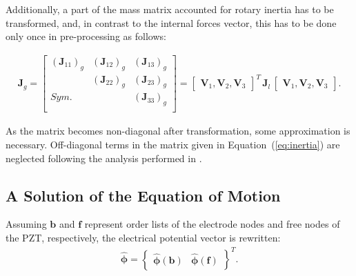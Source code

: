 \documentclass[sensors,article,accept,moreauthors,pdftex]{Definitions/mdpi}
\begin{document}
\begin{paracol}{2}
Additionally, a part of the mass matrix accounted for rotary inertia has to be transformed, and, in contrast to the internal forces vector, this has to be done only once in pre-processing as follows:

\begin{eqnarray}
\textbf{J}_g=\left [ 
\begin{array}{ccc}
	\left (\textbf{J}_{11}\right )_g & \left (\textbf{J}_{12}\right )_g & \left (\textbf{J}_{13}\right )_g\\
	 & \left (\textbf{J}_{22}\right )_g & \left (\textbf{J}_{23}\right )_g\\
	Sym. &  & \left (\textbf{J}_{33}\right )_g\\
\end{array}
\right ]
=\left[\begin{array}{ccc}
	\textbf{V}_1, \textbf{V}_2, \textbf{V}_3 \end{array}\right ]^T
\,\textbf{J}_l\,
\left[\begin{array}{ccc}
	\textbf{V}_1, \textbf{V}_2, \textbf{V}_3 \end{array}\right ].
\label{eq:inertia}
\end{eqnarray}

As the matrix becomes non-diagonal after transformation, some approximation is necessary.
Off-diagonal terms in the matrix given in Equation~(\ref{eq:inertia}) are neglected following the analysis performed in \cite{surana1980transition}.
\subsection{A Solution of the Equation of Motion}
\label{sec:time_integration}
Assuming \(\textbf{b}\) and \(\textbf{f}\) represent order lists of the electrode nodes and free nodes of the PZT, respectively, the electrical potential vector is rewritten:
\begin{eqnarray}
\widehat{\boldsymbol{\phi}} = \left \{\begin{array}{cc}
\widehat{\boldsymbol{\phi}}(\textbf{b}) &
\widehat{\boldsymbol{\phi}}(\textbf{f})
\end{array}\right \}^T.
\label{eq:potential}
\end{eqnarray}


\end{paracol}
\end{document}
